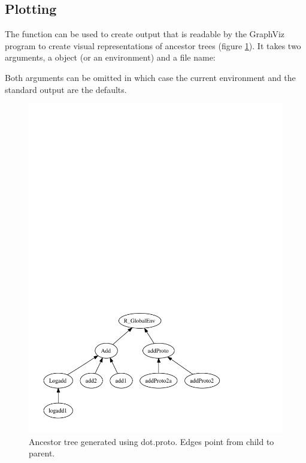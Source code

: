 \documentclass{Z}
\begin{document}
\subsection{Plotting}
\label{sec:plot}

The  function can be used to create output that is
readable by the GraphViz  program \citep{Ganser+North:1999}
to create visual representations of ancestor trees (figure
\ref{fig:proto-dot}).  It takes two arguments, a  object
(or an environment) and a file name:




Both arguments can be omitted in which case the current environment
and the standard output are the defaults.

\begin{figure}[tbp]
\begin{center}
\includegraphics{test.pdf}
\caption{\label{fig:proto-dot} Ancestor tree generated using dot.proto. Edges
point from child to parent.}
\end{center}
\end{figure}
\end{document}
